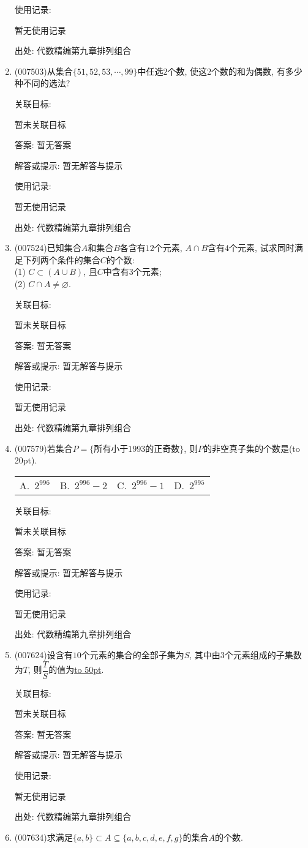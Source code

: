\documentclass[10pt,a4paper]{article}
\newcommand{\blank}[1]{\underline{\hbox to #1pt{}}}
\newcommand{\bracket}[1]{(\hbox to #1pt{})}
\newcommand{\fourch}[4]{\par\begin{tabular}{p{.23\textwidth}p{.23\textwidth}p{.23\textwidth}p{.23\textwidth}}
A.~#1 &B.~#2& C.~#3& D.~#4
\end{tabular}}
\begin{document}
\begin{enumerate}[1.]
使用记录:

暂无使用记录


出处: 代数精编第九章排列组合
\item { (007503)}从集合$\{51,52,53,\cdots ,99\}$中任选$2$个数, 使这$2$个数的和为偶数, 有多少种不同的选法?


关联目标:

暂未关联目标

答案: 暂无答案

解答或提示: 暂无解答与提示

使用记录:

暂无使用记录


出处: 代数精编第九章排列组合
\item { (007524)}已知集合$A$和集合$B$各含有$12$个元素, $A\cap B$含有$4$个元素, 试求同时满足下列两个条件的集合$C$的个数:\\
(1) $C\subset (A\cup B)$, 且$C$中含有$3$个元素;\\
(2) $C\cap A\ne \varnothing$.


关联目标:

暂未关联目标

答案: 暂无答案

解答或提示: 暂无解答与提示

使用记录:

暂无使用记录


出处: 代数精编第九章排列组合
\item { (007579)}若集合$P=\{\text{所有小于}1993\text{的正奇数}\}$, 则$P$的非空真子集的个数是\bracket{20}.
\fourch{$2^{996}$}{$2^{996}-2$}{$2^{996}-1$}{$2^{995}$}


关联目标:

暂未关联目标

答案: 暂无答案

解答或提示: 暂无解答与提示

使用记录:

暂无使用记录


出处: 代数精编第九章排列组合
\item { (007624)}设含有$10$个元素的集合的全部子集为$S$, 其中由$3$个元素组成的子集数为$T$, 则$\dfrac TS$的值为\blank{50}.


关联目标:

暂未关联目标

答案: 暂无答案

解答或提示: 暂无解答与提示

使用记录:

暂无使用记录


出处: 代数精编第九章排列组合
\item { (007634)}求满足$\{a,b\}\subset A\subseteq \{a,b,c,d,e,f,g\}$的集合$A$的个数.



\end{enumerate}
\end{document}
